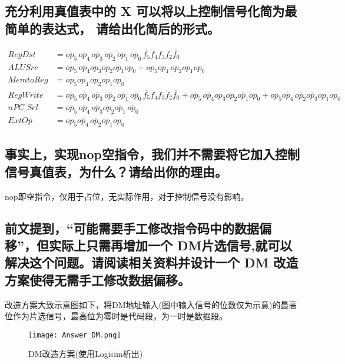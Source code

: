 \documentclass[UTF8]{ctexart}
\begin{document}
\subsection{充分利用真值表中的 X 可以将以上控制信号化简为最简单的表达式， 请给出化简后的形式。}
\begin{equation*}
	\begin{aligned}
		RegDst   & =\overline{op_5}\,\overline{op_4}\,\overline{op_3}\,\overline{op_2}\,\overline{op_1}\,\overline{op_0}\,\overline{f_5}f_4f_3f_2\overline{f_0}                                                                                                                         \\
		ALUSrc   & =\overline{op_5}\,\overline{op_4}op_3op_2\overline{op_1}op_0+op_5\overline{op_4}\,\overline{op_2}op_1op_0                                                                                                                                                            \\
		MemtoReg & =op_5\overline{op_4}\,\overline{op_2}op_1op_0                                                                                                                                                                                                                        \\
		RegWrite & =\overline{op_5}\,\overline{op_4}\,\overline{op_3}\,\overline{op_2}\,\overline{op_1}\,\overline{op_0}\,\overline{f_5}f_4f_3f_2\overline{f_0}+\overline{op_5}\,\overline{op_4}op_3op_2\overline{op_1}op_0+op_5\overline{op_4}\,\overline{op_2}\overline{op_3}op_1op_0 \\
		nPC\_Sel & =\overline{op_5}\,\overline{op_4}\,\overline{op_3}op_2\overline{op_1}\,\overline{op_0}                                                                                                                                                                               \\
		ExtOp    & =op_5\overline{op_4}\,\overline{op_2}op_1op_0
	\end{aligned}
\end{equation*}
\subsection{事实上，实现nop空指令，我们并不需要将它加入控制信号真值表，为什么？请给出你的理由。}
nop即空指令，仅用于占位，无实际作用，对于控制信号没有影响。
\subsection{前文提到，“可能需要手工修改指令码中的数据偏移”，但实际上只需再增加一个 DM片选信号,就可以解决这个问题。请阅读相关资料并设计一个 DM 改造方案使得无需手工修改数据偏移。}
改造方案大致示意图如下，将DM地址输入(图中输入信号的位数仅为示意)的最高位作为片选信号，最高位为零时是代码段，为一时是数据段。
\begin{figure}[H]
	\centering
	\texttt{[image: Answer\_DM.png]}
	\caption{DM改造方案(使用Logisim析出)}
\end{figure}
\end{document}
